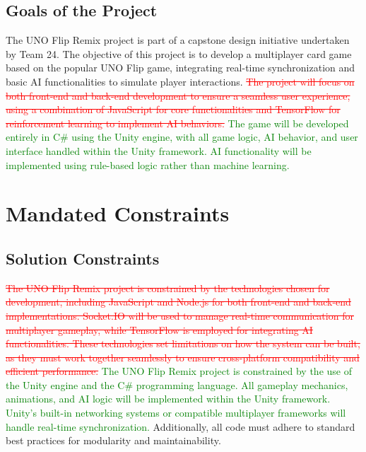 \documentclass[12pt]{article}
\newcommand{\removed}[1]{\textcolor{red}{\sout{#1}}}
\newcommand{\added}[1]{\textcolor{green}{#1}}
\begin{document}
\subsection{Goals of the Project}
The UNO Flip Remix project is part of a capstone design initiative undertaken by Team 24. The objective of this project is to develop a multiplayer card game based on the popular UNO Flip game, integrating real-time synchronization and basic AI functionalities to simulate player interactions. \removed{The project will focus on both front-end and back-end development to ensure a seamless user experience, using a combination of JavaScript for core functionalities and TensorFlow for reinforcement learning to implement AI behaviors.} \added{The game will be developed entirely in C\# using the Unity engine, with all game logic, AI behavior, and user interface handled within the Unity framework. AI functionality will be implemented using rule-based logic rather than machine learning.}

\section{Mandated Constraints}

\subsection{Solution Constraints}
\removed{The UNO Flip Remix project is constrained by the technologies chosen for development, including JavaScript and Node.js for both front-end and back-end implementations. Socket.IO will be used to manage real-time communication for multiplayer gameplay, while TensorFlow is employed for integrating AI functionalities. These technologies set limitations on how the system can be built, as they must work together seamlessly to ensure cross-platform compatibility and efficient performance.}
\added{The UNO Flip Remix project is constrained by the use of the Unity engine and the C\# programming language. All gameplay mechanics, animations, and AI logic will be implemented within the Unity framework. Unity’s built-in networking systems or compatible multiplayer frameworks will handle real-time synchronization.}
Additionally, all code must adhere to standard best practices for modularity and maintainability.
\end{document}
